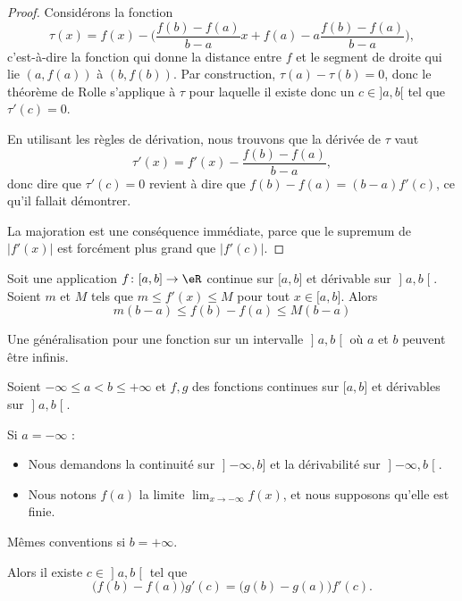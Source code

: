 \begin{proof}
	Considérons la fonction
	\begin{equation}
		\tau(x)=f(x)-\Big( \frac{ f(b)-f(a) }{ b-a }x + f(a) - a\frac{ f(b)-f(a) }{ b-a } \Big),
	\end{equation}
	c'est-à-dire la fonction qui donne la distance entre \( f\) et le segment de droite qui lie \( (a,f(a))\) à \( (b,f(b))\). Par construction, \( \tau(a)-\tau(b)=0\), donc le théorème de Rolle s'applique à \( \tau\) pour laquelle il existe donc un \( c\in]a,b[\) tel que \( \tau'(c)=0\).

	En utilisant les règles de dérivation, nous trouvons que la dérivée de \( \tau\) vaut
	\begin{equation}
		\tau'(x)= f'(x)-\frac{ f(b)-f(a) }{ b-a },
	\end{equation}
	donc dire que \( \tau'(c)=0\) revient à dire que \( f(b)-f(a)=(b-a)f'(c)\), ce qu'il fallait démontrer.

	La majoration est une conséquence immédiate, parce que le supremum de \( | f'(x) |\) est forcément plus grand que \( | f'(c) |\).
\end{proof}

\begin{theorem}	\label{THOooRALIooVGDcFi}
	Soit une application \(f \colon \mathopen[ a,b\mathclose]\to \eR  \) continue sur \( \mathopen[ a,b\mathclose]\) et dérivable sur \( \mathopen] a,b\mathclose[\). Soient \( m\) et \( M\) tels que \( m\leq f'(x)\leq M\) pour tout \( x\in\mathopen[ a,b\mathclose]\). Alors
	\begin{equation}
		m(b-a)\leq f(b)-f(a)\leq M(b-a)
	\end{equation}
\end{theorem}


Une généralisation pour une fonction sur un intervalle \( \mathopen] a , b \mathclose[\) où \( a\) et \( b\) peuvent être infinis.
\begin{theorem} \label{THOooRIIBooOjkzMa}
	Soient \( -\infty\leq a<b\leq +\infty\) et \( f,g\) des fonctions continues sur \( \mathopen[ a , b \mathclose]\) et dérivables sur \( \mathopen] a , b \mathclose[\).

		Si \( a=-\infty\) :
		\begin{itemize}
			\item Nous demandons la continuité sur \( \mathopen] -\infty , b \mathclose]\) et la dérivabilité sur \( \mathopen] -\infty , b \mathclose[\).
			\item
			      Nous notons \( f(a)\) la limite \( \lim_{x\to -\infty} f(x)\), et nous supposons qu'elle est finie.
		\end{itemize}

		Mêmes conventions si \( b=+\infty\).

		Alors il existe \( c\in \mathopen] a , b \mathclose[\) tel que
	\begin{equation}
		\big( f(b)-f(a) \big)g'(c)=\big( g(b)-g(a) \big)f'(c).
	\end{equation}
\end{theorem}


